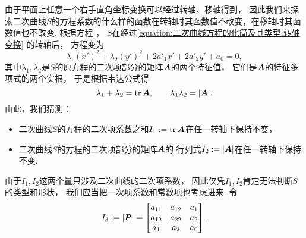 由于平面上任意一个右手直角坐标变换可以经过转轴、移轴得到，
因此我们来探索二次曲线\(S\)的方程系数的什么样的函数在转轴时其函数值不改变，在移轴时其函数值也不改变.
根据方程 ，
\(S\)在经过\cref{equation:二次曲线方程的化简及其类型.转轴变换} 的转轴后，
方程变为\begin{equation*}
	\lambda_1 (x')^2 + \lambda_2 (y')^2 + 2 a'_1 x' + 2 a'_2 y' + a_ 0 = 0,
\end{equation*}
其中\(\lambda_1,\lambda_2\)是\(S\)的原方程的二次项部分的矩阵\(\boldsymbol{A}\)的两个特征值，
它们是\(\boldsymbol{A}\)的特征多项式的两个实根，
于是根据韦达公式得\begin{equation*}
	\lambda_1 + \lambda_2 = \tr\boldsymbol{A},
	\qquad
	\lambda_1 \lambda_2 = \abs{\boldsymbol{A}}.
\end{equation*}
由此，我们猜测：\begin{itemize}
	\item 二次曲线\(S\)的方程的二次项系数之和\(I_1 := \tr\boldsymbol{A}\)在任一转轴下保持不变，
	\item 二次曲线\(S\)的方程的二次项部分的矩阵\(\boldsymbol{A}\)的
	行列式\(I_2 := \abs{\boldsymbol{A}}\)在任一转轴下保持不变.
\end{itemize}

由于\(I_1,I_2\)这两个量只涉及二次曲线的二次项系数，
因此仅凭\(I_1,I_2\)肯定无法判断\(S\)的类型和形状，
我们应当把一次项系数和常数项也考虑进来.
令\begin{equation*}
	I_3 := \abs{\boldsymbol{P}}
	= \begin{bmatrix}
		a_{11} & a_{12} & a_1 \\
		a_{12} & a_{22} & a_2 \\
		a_1 & a_2 & a_0
	\end{bmatrix}.
\end{equation*}

